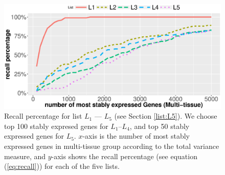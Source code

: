 \documentclass[letterpaper,12pt]{article}
\begin{document}

\begin{figure}[h!]
    \begin{center}
	\includegraphics[scale=0.55]{Figures/rankVSrank_RNA2.eps}
	\caption{Recall percentage for list $L_1$ --- $L_5$ (see Section \ref{list:L5}). We choose top 100 stably expresed genes for $L_1$--$L_4$, and top 50 stably expressed genes for $L_5$. $x$-axis is the number of most stably expressed genes in multi-tissue group according to the total variance measure, and $y$-axis shows the recall percentage (see equation (\ref{eq:recall}))  for each of the five lists.}
	\label{fig:rankVSrank_RNA}
    \end{center}
\end{figure}
\end{document}
